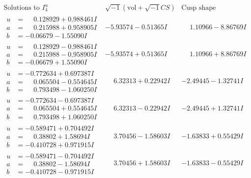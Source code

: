 \documentclass[1p]{elsarticle_modified}
\theoremstyle{definition}
\newcommand{\I}{\sqrt{-1}}
\begin{document}
$$\begin{array}{c|c|c}  
\text{Solutions to }I^u_{4}& \I (\text{vol} + \sqrt{-1}CS) & \text{Cusp shape}\\
 \hline 
\begin{aligned}
u &= \phantom{-}0.128929 + 0.988461 I \\
a &= \phantom{-}0.215988 + 0.958905 I \\
b &= -0.06679 - 1.55090 I\end{aligned}
 & -5.93574 - 0.51365 I & \phantom{-}1.10966 - 8.86769 I \\ \hline\begin{aligned}
u &= \phantom{-}0.128929 - 0.988461 I \\
a &= \phantom{-}0.215988 - 0.958905 I \\
b &= -0.06679 + 1.55090 I\end{aligned}
 & -5.93574 + 0.51365 I & \phantom{-}1.10966 + 8.86769 I \\ \hline\begin{aligned}
u &= -0.772634 + 0.697387 I \\
a &= \phantom{-}0.065504 - 0.554645 I \\
b &= \phantom{-}0.793498 - 1.060250 I\end{aligned}
 & \phantom{-}6.32313 + 0.22942 I & -2.49445 - 1.32741 I \\ \hline\begin{aligned}
u &= -0.772634 - 0.697387 I \\
a &= \phantom{-}0.065504 + 0.554645 I \\
b &= \phantom{-}0.793498 + 1.060250 I\end{aligned}
 & \phantom{-}6.32313 - 0.22942 I & -2.49445 + 1.32741 I \\ \hline\begin{aligned}
u &= -0.589471 + 0.704492 I \\
a &= \phantom{-}0.38802 + 1.58694 I \\
b &= -0.410728 + 0.971915 I\end{aligned}
 & \phantom{-}3.70456 - 1.58603 I & -1.63833 + 0.55429 I \\ \hline\begin{aligned}
u &= -0.589471 - 0.704492 I \\
a &= \phantom{-}0.38802 - 1.58694 I \\
b &= -0.410728 - 0.971915 I\end{aligned}
 & \phantom{-}3.70456 + 1.58603 I & -1.63833 - 0.55429 I \\ \hline\begin{aligned}

\end{aligned}
\end{array}$$
\end{document}
